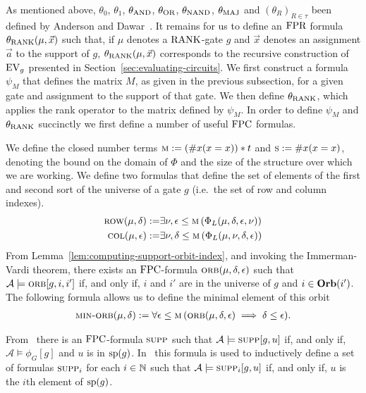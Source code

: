 \documentclass[../paper.tex]{subfiles}
\begin{document}
As mentioned above, $\theta_0$, $\theta_1$, $\theta_\text{\upshape AND}$, $\theta_\text{\upshape OR}$,
$\theta_\text{\upshape NAND}$, $\theta_\text{\upshape MAJ}$ and $(\theta_R)_{R \in \tau}$ been defined by
Anderson and Dawar~\cite{AndersonD17}. It remains for us to define an $\text{\upshape FPR}$
formula $\theta_{\text{\upshape RANK}}(\mu, \vec{x})$ such that, if $\mu$ denotes a
$\text{\upshape RANK}$-gate $g$ and $\vec{x}$ denotes an assignment $\vec{a}$ to the support of
$g$, $\theta_{\text{\upshape RANK}}(\mu, \vec{x})$ corresponds to the recursive construction of
$\text{EV}_g$ presented in Section~\ref{sec:evaluating-circuits}.  We first construct a formula
$\psi_M$ that defines the matrix $M$, as given in the previous subsection, for a
given gate and assignment to the support of that gate. We then define
$\theta_{\text{\upshape RANK}}$, which applies the rank operator to the matrix defined by
$\psi_M$. In order to define $\psi_M$ and $\theta_\text{\upshape RANK}$ succinctly we first
define a number of useful $\text{\upshape FPC}$ formulas.

We define the closed number terms $\textsc{m} := (\# x (x = x))*t$ and
$\textsc{s} := \# x(x = x)$, denoting the bound on the domain of $\Phi$ and the size of the
structure over which we are working. We define two formulas that define the set
of elements of the first and second sort of the universe of a gate $g$ (i.e.\ the
set of row and column indexes).
\begin{align*}
	\textsc{row} (\mu, \delta) :=   & \exists \nu, \epsilon \leq \textsc{m} \, (\Phi_L (\mu, \delta, \epsilon, \nu)) \\
	\textsc{col} (\mu, \epsilon) := & \exists \nu, \delta \leq \textsc{m} \, (\Phi_L (\mu, \nu, \delta , \epsilon))  
\end{align*}
From Lemma~\ref{lem:computing-support-orbit-index}, and invoking the
Immerman-Vardi theorem, there exists an $\text{\upshape FPC}$-formula $\textsc{orb}(\mu, \delta,
\epsilon)$ such that $\mathcal{A} \models \textsc{orb}[g,i, i']$ if, and only if,
$i$ and $i'$ are in the universe of $g$ and $i \in \text{\textbf{Orb}}(i')$. The following
formula allows us to define the minimal element of this orbit
\begin{align*}
	\textsc{min-orb} (\mu, \delta) := \forall \epsilon \leq \textsc{m} \, (\textsc{orb} (\mu, \delta, \epsilon) \implies \delta \leq \epsilon). 
\end{align*}


From~\cite{AndersonD17} there is an $\text{\upshape FPC}$-formula
$\textsc{supp}$ such that $\mathcal{A} \models \textsc{supp} [g, u]$ if, and only if,
$\mathcal{A} \models \phi_G [g]$ and $u$ is in
$\text{sp}(g)$. In~\cite{AndersonD17} this formula is used to inductively define a set of
formulas $\textsc{supp}_i$ for each $i \in \mathbb{N}$ such that $\mathcal{A} \models
\textsc{supp}_i[g, u]$ if, and only if, $u$ is the $i$th element of $\text{sp}(g)$.
\end{document}
